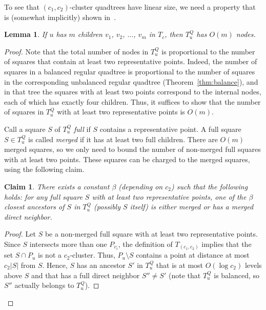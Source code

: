 \documentclass[11pt]{paper}
\newtheorem {lem}[theorem] {Lemma}
\newtheorem {claim}[theorem] {Claim}
\begin{document}
      To see that $(c_1, c_2)$-cluster quadtrees have linear size, we need 
      a property that is (somewhat implicitly)
      shown in~\cite[Section~4.3]{KrznaricLe98}.

      \begin{lem}\label{lem:c-cluster-QT}
      If $u$ has $m$ children $v_1$, $v_2$, $\ldots$, $v_m$ in $T_c$, 
      then $T^Q_u$ has $O(m)$ nodes.
      \end{lem}

      \begin{proof}
      Note that the total number of nodes in $T_u^Q$ is
      proportional to the number of 
      squares that contain at least two representative points.
      Indeed, the number of squares in a balanced regular quadtree
      is proportional to the number of squares in the corresponding 
      unbalanced regular quadtree (Theorem~\ref{thm:balance}), and in that tree 
      the squares with
      at least two points correspond to the internal nodes, each
      of which has exactly four children.
      Thus, it suffices to 
      show that the number of squares in $T_u^Q$ with at least two representative 
      points is $O(m)$.

      Call a square $S$ of $T_u^Q$ \emph{full} if $S$ contains a representative
      point. 
      A full square $S \in T_u^Q$ is called \emph{merged} if it has
      at least two full children.  There are
      $O(m)$ merged squares, so 
      we only need to bound the number of non-merged full squares
      with at least two points. 
      These squares can be charged to the merged squares,
      using the following claim.
     
      \begin{claim}\label{clm:merged_ancestor}
       There exists a constant $\beta$ (depending on $c_2$) such
       that the following holds:
      for any full square $S$ with at least two representative points,
      one of the $\beta$ closest ancestors of $S$
      in $T_u^Q$ (possibly $S$ itself) is either merged or 
      has a merged direct neighbor.
      \end{claim}
      \begin{proof}
      Let $S$ be a non-merged full square with at least two representative points.
      Since $S$ intersects more than one $P_{v_i}$, the definition of
      $T_{(c_1,c_2)}$ implies that the set 
      $S \cap P_u$ is not a $c_2$-cluster. Thus, 
      $P_u \setminus S$ contains a point at distance at most $c_2|S|$ from $S$.
      Hence, $S$ has an ancestor $S'$ in $T_u^Q$ that is at most
      $O(\log c_2)$ levels above $S$ and that has a full direct 
      neighbor $S'' \not= S'$ (note that $T_u^Q$ is balanced, so 
      $S''$ actually belongs to $T_u^Q$). 


\end{proof}
\end{proof}
\end{document}
